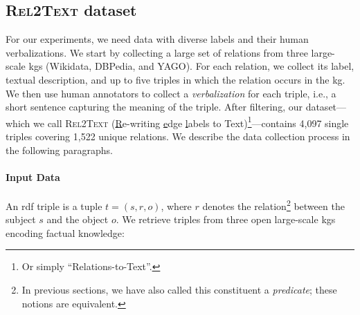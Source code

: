 % 









\subsection{\textsc{Rel2Text} dataset}
\label{sec:rel2text:data}
For our experiments, we need data with diverse labels and their human verbalizations. We start by collecting a large set of relations from three large-scale \acp{kg} (Wikidata, DBPedia, and YAGO). For each relation, we collect its label, textual description, and up to five triples in which the relation occurs in the \ac{kg}. We then use human annotators to collect a \emph{verbalization} for each triple, i.e., a short sentence capturing the meaning of the triple. After filtering, our dataset---which we call \textsc{Rel2Text} (\underline{R}e-writing \underline{e}dge \underline{l}abels to Text)\footnote{Or simply ``Relations-to-Text''.}---contains 4,097 single triples covering 1,522 unique relations. We describe the data collection process in the following paragraphs.


\paragraph{Input Data}
An \acs{rdf} triple is a tuple $t = (s, r, o)$, where $r$ denotes the relation\footnote{In previous sections, we have also called this constituent a \emph{predicate}; these notions are equivalent.} between the subject $s$ and the object $o$.
We retrieve triples from three open large-scale \acp{kg} encoding factual knowledge:


